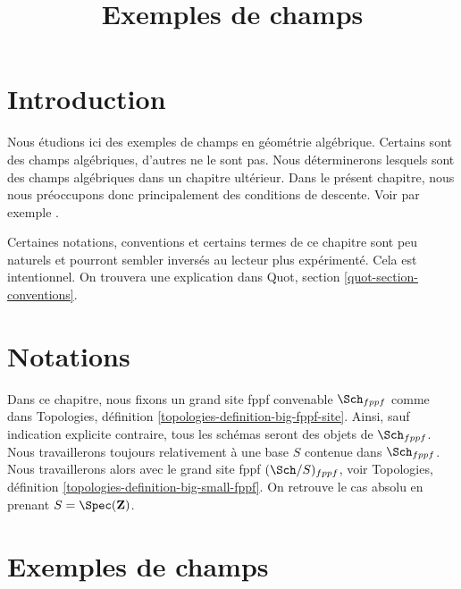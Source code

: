 

%


\title{Exemples de champs}


\maketitle

\label{section-phantom}

\tableofcontents

\section{Introduction}
\label{section-introduction}

\noindent
Nous étudions ici des exemples de champs en géométrie algébrique.
Certains sont des champs algébriques, d'autres ne le sont pas.
Nous déterminerons lesquels sont des champs algébriques dans un chapitre ultérieur.
Dans le présent chapitre, nous nous préoccupons donc principalement des conditions
de descente. Voir par exemple \cite{Vis2}.

\medskip\noindent
Certaines notations, conventions et certains termes de ce chapitre sont peu naturels
et pourront sembler inversés au lecteur plus expérimenté. Cela est intentionnel.
On trouvera une explication dans Quot, section \ref{quot-section-conventions}.




\section{Notations}
\label{section-notation}

\noindent
Dans ce chapitre, nous fixons un grand site fppf convenable $\Sch_{fppf}$
comme dans Topologies, définition \ref{topologies-definition-big-fppf-site}.
Ainsi, sauf indication explicite contraire, tous les schémas seront des objets
de $\Sch_{fppf}$.
Nous travaillerons toujours relativement à une base $S$ contenue dans $\Sch_{fppf}$.
Nous travaillerons alors avec le grand site fppf $(\Sch/S)_{fppf}$,
voir Topologies, définition \ref{topologies-definition-big-small-fppf}.
On retrouve le cas absolu en prenant
$S = \Spec(\mathbf{Z})$.




\section{Exemples de champs}
\label{section-examples-stacks}

